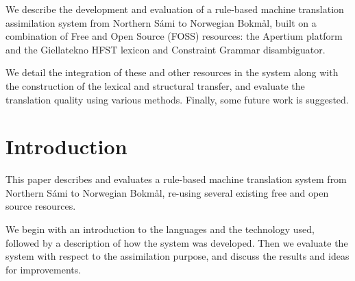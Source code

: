 \newcommand{\comment}[1]{\textbf{TODO:~#1}}
\renewcommand{\comment}[1]{} %


\newcommand{\href}[2]{{\tt #1}} %

\newcommand{\sme}{{\tt sme}}
\newcommand{\nob}{{\tt nob}}
\newcommand{\smenob}{\sme$\rightarrow{}$\nob}
\newcommand{\nobsme}{\nob$\rightarrow{}$\sme}






  
We describe the development and evaluation of a rule-based machine
translation assimilation system from Northern S\'{a}mi to Norwegian Bokm{\aa}l,
built on a combination of Free and Open Source (FOSS) resources: the
Apertium platform and the Giellatekno HFST lexicon and Constraint
Grammar disambiguator.

We detail the integration of these and other resources in the system
along with the construction of the lexical and structural transfer,
and evaluate the translation quality using various methods. Finally,
some future work is suggested.




\section{Introduction} %
This paper describes and evaluates a rule-based machine translation
system from Northern S\'{a}mi to Norwegian Bokm{\aa}l, re-using several
existing free and open source resources. 

We begin with an introduction to the languages and the technology
used, followed by a description of how the system was developed. Then
we evaluate the system with respect to the assimilation purpose, and
discuss the results and ideas for improvements.

